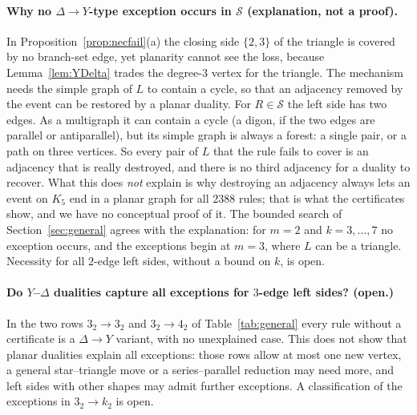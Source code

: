 \documentclass[10pt]{article}
\theoremstyle{definition}
\theoremstyle{plain}
\theoremstyle{remark}
\begin{document}
\paragraph{Why no $\Delta\to Y$-type exception occurs in $\mathcal S$ (explanation, not a proof).} In Proposition~\ref{prop:necfail}(a) the closing side $\{2,3\}$ of the triangle is covered by no branch-set edge, yet planarity cannot see the loss, because Lemma~\ref{lem:YDelta} trades the degree-3 vertex for the triangle. The mechanism needs the simple graph of $L$ to contain a cycle, so that an adjacency removed by the event can be restored by a planar duality. For $R\in\mathcal S$ the left side has two edges. As a multigraph it can contain a cycle (a digon, if the two edges are parallel or antiparallel), but its simple graph is always a forest: a single pair, or a path on three vertices. So every pair of $L$ that the rule fails to cover is an adjacency that is really destroyed, and there is no third adjacency for a duality to recover. What this does \emph{not} explain is why destroying an adjacency always lets an event on $K_5$ end in a planar graph for all $2388$ rules; that is what the certificates show, and we have no conceptual proof of it. The bounded search of Section~\ref{sec:general} agrees with the explanation: for $m=2$ and $k=3,\dots,7$ no exception occurs, and the exceptions begin at $m=3$, where $L$ can be a triangle. Necessity for all $2$-edge left sides, without a bound on $k$, is open.

\paragraph{Do $Y$--$\Delta$ dualities capture all exceptions for $3$-edge left sides? (open.)} In the two rows $3_2\to3_2$ and $3_2\to4_2$ of Table~\ref{tab:general} every rule without a certificate is a $\Delta\to Y$ variant, with no unexplained case. This does not show that planar dualities explain all exceptions: those rows allow at most one new vertex, a general star--triangle move or a series--parallel reduction may need more, and left sides with other shapes may admit further exceptions. A classification of the exceptions in $3_2\to k_2$ is open.
\end{document}
